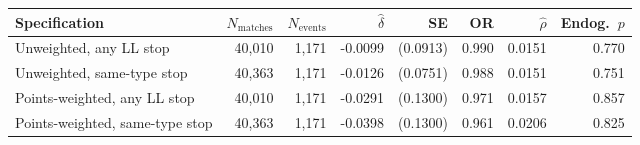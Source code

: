 \begin{tabular}{lrrrrrrr}
\toprule
Specification & $N_{\text{matches}}$ & $N_{\text{events}}$ & $\hat{\delta}$ & SE & OR & $\hat{\rho}$ & Endog.\ $p$ \\
\midrule
Unweighted, any LL stop & 40,010 & 1,171 & -0.0099 & (0.0913) & 0.990 & 0.0151 & 0.770 \\
Unweighted, same-type stop & 40,363 & 1,171 & -0.0126 & (0.0751) & 0.988 & 0.0151 & 0.751 \\
Points-weighted, any LL stop & 40,010 & 1,171 & -0.0291 & (0.1300) & 0.971 & 0.0157 & 0.857 \\
Points-weighted, same-type stop & 40,363 & 1,171 & -0.0398 & (0.1300) & 0.961 & 0.0206 & 0.825 \\
\bottomrule
\end{tabular}
